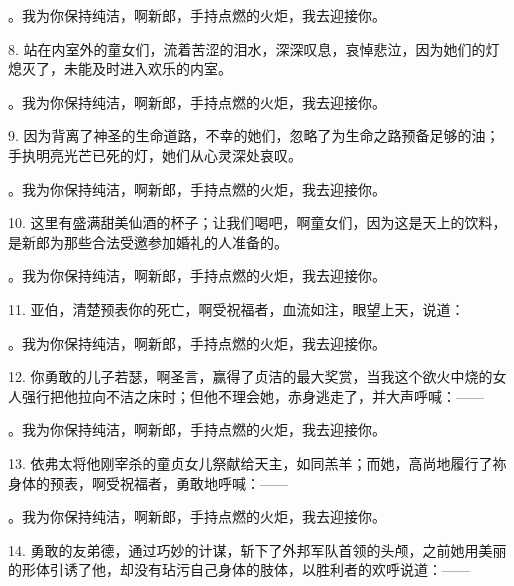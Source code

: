  。我为你保持纯洁，啊新郎，手持点燃的火炬，我去迎接你。\par

 8. 站在内室外的童女们，流着苦涩的泪水，深深叹息，哀悼悲泣，因为她们的灯熄灭了，未能及时进入欢乐的内室。\par

 。我为你保持纯洁，啊新郎，手持点燃的火炬，我去迎接你。\par

 9. 因为背离了神圣的生命道路，不幸的她们，忽略了为生命之路预备足够的油；手执明亮光芒已死的灯，她们从心灵深处哀叹。\par

 。我为你保持纯洁，啊新郎，手持点燃的火炬，我去迎接你。\par

 10. 这里有盛满甜美仙酒的杯子；让我们喝吧，啊童女们，因为这是天上的饮料，是新郎为那些合法受邀参加婚礼的人准备的。\par

 。我为你保持纯洁，啊新郎，手持点燃的火炬，我去迎接你。\par

 11. 亚伯，清楚预表你的死亡，啊受祝福者，血流如注，眼望上天，说道：\par

 。我为你保持纯洁，啊新郎，手持点燃的火炬，我去迎接你。\par

 12. 你勇敢的儿子若瑟，啊圣言，赢得了贞洁的最大奖赏，当我这个欲火中烧的女人强行把他拉向不洁之床时；但他不理会她，赤身逃走了，并大声呼喊：——\par

 。我为你保持纯洁，啊新郎，手持点燃的火炬，我去迎接你。\par

 13. 依弗太将他刚宰杀的童贞女儿祭献给天主，如同羔羊；而她，高尚地履行了祢身体的预表，啊受祝福者，勇敢地呼喊：——\par

 。我为你保持纯洁，啊新郎，手持点燃的火炬，我去迎接你。\par

 14. 勇敢的友弟德，通过巧妙的计谋，斩下了外邦军队首领的头颅，之前她用美丽的形体引诱了他，却没有玷污自己身体的肢体，以胜利者的欢呼说道：——\par

